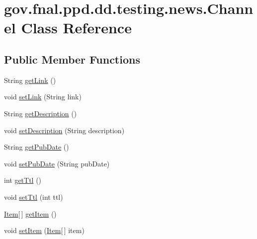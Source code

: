 \hypertarget{classgov_1_1fnal_1_1ppd_1_1dd_1_1testing_1_1news_1_1Channel}{\section{gov.\-fnal.\-ppd.\-dd.\-testing.\-news.\-Channel Class Reference}
\label{classgov_1_1fnal_1_1ppd_1_1dd_1_1testing_1_1news_1_1Channel}
}
\subsection*{Public Member Functions}
\begin{DoxyCompactItemize}
\item 
String \hyperlink{classgov_1_1fnal_1_1ppd_1_1dd_1_1testing_1_1news_1_1Channel_a72b167dc37639f2827b0ab715602e16a}{get\-Link} ()
\item 
void \hyperlink{classgov_1_1fnal_1_1ppd_1_1dd_1_1testing_1_1news_1_1Channel_aa43a78890b746f56c7443a851e72dcd0}{set\-Link} (String link)
\item 
String \hyperlink{classgov_1_1fnal_1_1ppd_1_1dd_1_1testing_1_1news_1_1Channel_a70d9cbe1feae4b330e46597c2392b5a1}{get\-Description} ()
\item 
void \hyperlink{classgov_1_1fnal_1_1ppd_1_1dd_1_1testing_1_1news_1_1Channel_add366d14b9a3373380ef6d9e82a1a03a}{set\-Description} (String description)
\item 
String \hyperlink{classgov_1_1fnal_1_1ppd_1_1dd_1_1testing_1_1news_1_1Channel_a4bcb6e9366c9c3206990f43c6b3b1fe6}{get\-Pub\-Date} ()
\item 
void \hyperlink{classgov_1_1fnal_1_1ppd_1_1dd_1_1testing_1_1news_1_1Channel_ab290deaaf372925f34064e96f99f9ade}{set\-Pub\-Date} (String pub\-Date)
\item 
int \hyperlink{classgov_1_1fnal_1_1ppd_1_1dd_1_1testing_1_1news_1_1Channel_aa8a658ddc9a60c2e3a1747255fc1b3f5}{get\-Ttl} ()
\item 
void \hyperlink{classgov_1_1fnal_1_1ppd_1_1dd_1_1testing_1_1news_1_1Channel_a534569898b6cb50471d141aae7aaccec}{set\-Ttl} (int ttl)
\item 
\hyperlink{classgov_1_1fnal_1_1ppd_1_1dd_1_1testing_1_1news_1_1Item}{Item}\mbox{[}$\,$\mbox{]} \hyperlink{classgov_1_1fnal_1_1ppd_1_1dd_1_1testing_1_1news_1_1Channel_ac243d552e2972ed827062fb73d30b37f}{get\-Item} ()
\item 
void \hyperlink{classgov_1_1fnal_1_1ppd_1_1dd_1_1testing_1_1news_1_1Channel_a8b1f596c6109cdb4239e73d37b971816}{set\-Item} (\hyperlink{classgov_1_1fnal_1_1ppd_1_1dd_1_1testing_1_1news_1_1Item}{Item}\mbox{[}$\,$\mbox{]} item)

\end{DoxyCompactItemize}
